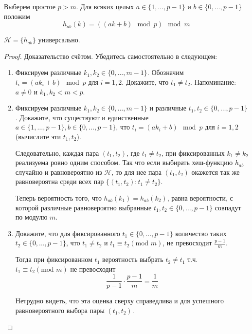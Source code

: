 Выберем простое $p > m$. Для всяких целых $a \in \{1, \ldots, p-1\}$ и $b \in \{0, \ldots, p-1\}$ положим $$h_{ab}(k) = ((ak+b)\mod p) \mod m$$
\begin{theorem*}
	$\mathcal{H} = \{h_{ab}\}$  универсально.
\end{theorem*}
\begin{proof}
Доказательство счётом. Убедитесь самостоятельно в следующем:
\begin{enumerate}
\item Фиксируем различные $k_1, k_2 \in \{0, \ldots, m-1\}$. Обозначим $t_i = (ak_i + b)\mod p$ для $i = 1,2$. Докажите, что $t_1 \neq t_2$. Напоминание: $a\neq 0$ и $k_1, k_2 < m < p$.

\item Фиксируем различные $k_1, k_2 \in \{0, \ldots, m-1\}$ и различные $t_1, t_2 \in \{0, \ldots, p-1\}$. Докажите, что существуют и единственные $a \in \{1, \ldots, p-1\}, b \in \{0, \ldots, p-1\}$, что $t_i = (ak_i+b)\mod p$ для $i=1,2$ (вычислите эти $t_1, t_2$).

Следовательно, каждая пара $(t_1, t_2)$, где $t_1 \neq t_2$, при фиксированных $k_1 \neq k_2$ реализуема ровно одним способом. Так что если выбирать хеш-функцию $h_{ab}$ случайно и равновероятно из $\mathcal{H}$, то для нее пара $(t_1, t_2)$ окажется так же равновероятна среди всех пар $\{(t_1, t_2) \colon t_1 \neq t_2\}$.

Теперь вероятность того, что $h_{ab}(k_1) = h_{ab}(k_2)$, равна вероятности, с которой различные равновероятно выбранные $t_1, t_2 \in \{0, \ldots, p-1\}$ совпадут по модулю $m$.

\item Докажите, что для фиксированного $t_1 \in \{0, \ldots, p-1\}$ количество таких $t_2 \in \{0, \ldots, p-1\}$, что $t_1 \neq t_2$ и $t_1 \equiv t_2(\text{mod }m)$, не превосходит $\frac{p-1}{m}$.

Тогда при фиксированном $t_1$ вероятность выбрать $t_2 \neq t_1$ т.ч. $t_1\equiv t_2 (\text{mod }m)$ не превосходит $$\frac{1}{p-1} \cdot \frac{p-1}{m} = \frac{1}{m}$$

Нетрудно видеть, что эта оценка сверху справедлива и для успешного равновероятного выбора пары $(t_1, t_2)$.
\end{enumerate}
\end{proof}



